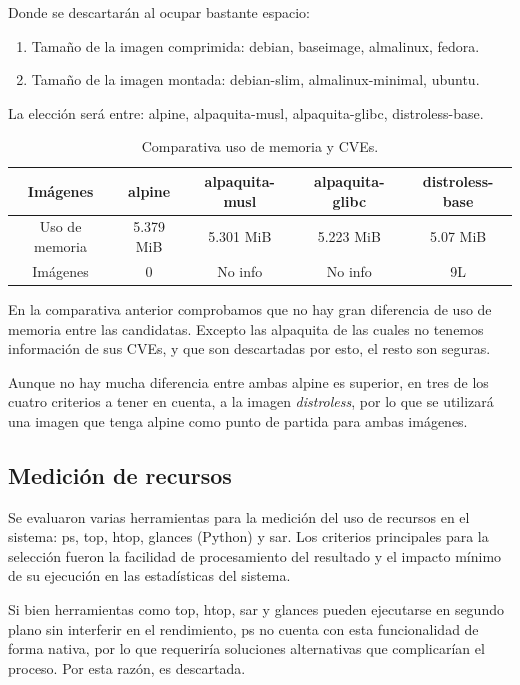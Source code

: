 Donde se descartarán al ocupar bastante espacio:
\begin{enumerate}
    \item Tamaño de la imagen comprimida: debian, baseimage, almalinux, fedora.
    \item Tamaño de la imagen montada: debian-slim, almalinux-minimal, ubuntu.
\end{enumerate}

La elección será entre: alpine, alpaquita-musl, alpaquita-glibc, distroless-base.

\begin{table}[H]
    \centering
    \begin{adjustbox}{width=\textwidth, totalheight=\textheight, keepaspectratio}
        \begin{tabular}{|c|c|c|c|c|}
        \hline
        Imágenes & alpine & alpaquita-musl & alpaquita-glibc & distroless-base \\
        \hline
        Uso de memoria & 5.379 MiB & 5.301 MiB & 5.223 MiB & 5.07 MiB \\
        \hline
        Imágenes & 0 & No info & No info & 9L \\
        \end{tabular}
    \end{adjustbox}
    \caption{Comparativa uso de memoria y CVEs.}
\end{table}

En la comparativa anterior comprobamos que no hay gran diferencia de uso de memoria entre las candidatas. Excepto las alpaquita de las cuales no tenemos información de sus CVEs, y que son descartadas por esto, el resto son seguras.

Aunque no hay mucha diferencia entre ambas alpine es superior, en tres de los cuatro criterios a tener en cuenta, a la imagen \textit{distroless}, por lo que se utilizará una imagen que tenga alpine como punto de partida para ambas imágenes. 

\subsection{Medición de recursos}
Se evaluaron varias herramientas para la medición del uso de recursos en el sistema: ps, top, htop, glances (Python) y sar. Los criterios principales para la selección fueron la facilidad de procesamiento del resultado y el impacto mínimo de su ejecución en las estadísticas del sistema.

Si bien herramientas como top, htop, sar y glances pueden ejecutarse en segundo plano sin interferir en el rendimiento, ps no cuenta con esta funcionalidad de forma nativa, por lo que requeriría soluciones alternativas que complicarían el proceso. Por esta razón, es descartada.

